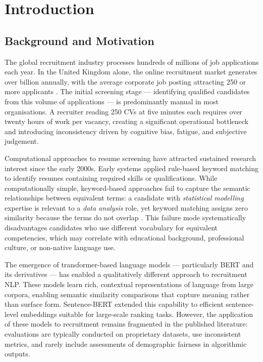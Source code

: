 \chapter{Introduction}

\section{Background and Motivation}

The global recruitment industry processes hundreds of millions of job applications each year. In the United Kingdom alone, the online recruitment market generates over  billion annually, with the average corporate job posting attracting 250 or more applicants \citep{CIPD2023}. The initial screening stage --- identifying qualified candidates from this volume of applications --- is predominantly manual in most organisations. A recruiter reading 250 CVs at five minutes each requires over twenty hours of work per vacancy, creating a significant operational bottleneck and introducing inconsistency driven by cognitive bias, fatigue, and subjective judgement.

Computational approaches to resume screening have attracted sustained research interest since the early 2000s. Early systems applied rule-based keyword matching to identify resumes containing required skills or qualifications. While computationally simple, keyword-based approaches fail to capture the semantic relationships between equivalent terms: a candidate with \textit{statistical modelling} expertise is relevant to a \textit{data analysis} role, yet keyword matching assigns zero similarity because the terms do not overlap \citep{Salton1983}. This failure mode systematically disadvantages candidates who use different vocabulary for equivalent competencies, which may correlate with educational background, professional culture, or non-native language use.

The emergence of transformer-based language models --- particularly BERT \citep{Devlin2019} and its derivatives --- has enabled a qualitatively different approach to recruitment NLP. These models learn rich, contextual representations of language from large corpora, enabling semantic similarity comparisons that capture meaning rather than surface form. Sentence-BERT \citep{Reimers2019} extended this capability to efficient sentence-level embeddings suitable for large-scale ranking tasks. However, the application of these models to recruitment remains fragmented in the published literature: evaluations are typically conducted on proprietary datasets, use inconsistent metrics, and rarely include assessments of demographic fairness in algorithmic outputs.

